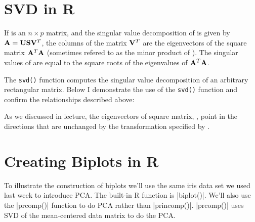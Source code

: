 
\section{SVD in R}

If  is an $n \times p$ matrix, and the singular value decomposition of  is given by $\mathbf{A} = \mathbf{U} \mathbf{S} \mathbf{V}^T$, the columns of the  matrix $\mathbf{V}^T$ are the eigenvectors of the square matrix $\mathbf{A}^T \mathbf{A}$ (sometimes refered to  as the minor product of ). The singular values of  are equal to the square roots of the eigenvalues of $\mathbf{A}^T \mathbf{A}$. 

The \verb|svd()| function computes the singular value decomposition of an arbitrary rectangular matrix. Below I demonstrate the use of the \verb|svd()| function and confirm the relationships described above:


As we discussed in lecture, the eigenvectors of square matrix, , point in the directions that are unchanged by the transformation specified by .



\section{Creating Biplots in R}

To illustrate the construction of biplots we'll use the same iris data set we used last week to introduce PCA. The built-in R function is |biplot()|. We'll also use the |prcomp()| function to do PCA rather than |princomp()|. |prcomp()| uses SVD of the mean-centered data matrix to do the PCA.

